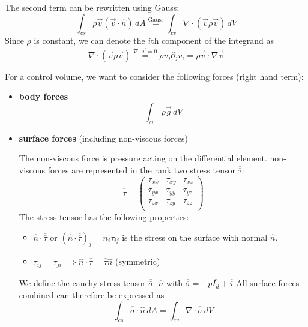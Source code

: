 The second term can be rewritten using Gauss:
\begin{equation*}
	\int_{cs} \rho \vec v(\vec v \cdot \hat n) \,dA \stackrel{\text{Gauss}}{=} \int_{cv} \nabla\cdot (\vec v \rho \vec v)\,dV
\end{equation*}
Since $\rho$ is constant, we can denote the $i$th component of the integrand as 
\begin{equation*}
	\nabla\cdot (\vec v \rho \vec v)\stackrel{\nabla \cdot \vec v = 0}= \rho v_j \partial_j v_i = \rho \vec v \cdot \nabla \vec v
\end{equation*}

For a control volume, we want to consider the following forces (right hand term):
\begin{itemize}
	\setlength{\itemsep}{-5pt}
	\item \textbf{body forces}
	\begin{equation*}
		\int_{cv} \rho \vec g \,dV
	\end{equation*}
	\item \textbf{surface forces} (including non-viscous forces)
	
	The non-viscous force is pressure acting on the differential element. non-viscous forces are represented in the rank two stress tensor $\overline{\overline{\tau}}$:
	\begin{equation*}
		\overline{\overline{\tau}} = \begin{pmatrix}
			\tau_{xx}&\tau_{xy}&\tau_{xz}\\
			\tau_{yx}&\tau_{yy}&\tau_{yz}\\
			\tau_{zx}&\tau_{zy}&\tau_{zz}\\
		\end{pmatrix}
	\end{equation*}
	The stress tensor has the following properties:
	\begin{itemize}
		\item $\hat n \cdot \overline{\overline{\tau}}$ or $(\hat n \cdot \overline{\overline{\tau}})_j = n_i\tau_{ij}$ is the stress on the surface with normal $\hat n$.
		\item $\tau_{ij} = \tau_{ji}\implies \hat n \cdot \overline{\overline{\tau}}  = \overline{\overline{\tau}} \hat n$ (symmetric)
	\end{itemize}
	We define the cauchy stress tensor $\overline{\overline \sigma}\cdot \hat n$ with $\overline{\overline \sigma} = -p\overline{\overline{I_d}} + \overline{\overline{\tau}}$ All surface forces combined can therefore be expressed as
	\begin{equation*}
		\int_{cs} \overline{\overline \sigma }\cdot \hat n  \,dA = \int_{cv} \nabla \cdot \overline{\overline {\sigma}}\,dV
	\end{equation*}
\end{itemize}

